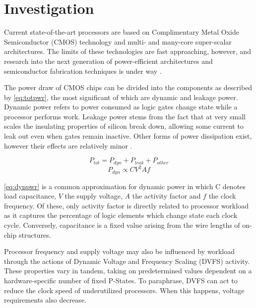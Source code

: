 \section{Investigation}
\label{sec:investigation}


Current state-of-the-art processors are based on Complimentary Metal Oxide Semiconductor (CMOS) technology and multi- and many-core super-scalar architectures. The limits of these technologies are fast  approaching, however, and research into the next generation of power-efficient architectures and semiconductor fabrication techniques is under way \cite{esmaeilzadeh:2011aa}.

The power draw of CMOS chips can be divided into the components as described by \autoref{eq:totpwr}, the most significant of which are dynamic and leakage power. Dynamic power refers to power consumed as logic gates change state while a processor performs work. Leakage power stems from the fact that at very small scales the insulating properties of silicon break down, allowing some current to leak out even when gates remain inactive. Other forms of power dissipation exist, however their effects are relatively minor \cite{kaxiras:2008aa}.


\begin{equation}
\label{eq:totpwr}
P_{tot} = P_{dyn} + P_{leak} + P_{other}
\end{equation}
\begin{equation} 
\label{eq:dynpwr}
P_{dyn} \propto CV^{2}Af
\end{equation}

\autoref{eq:dynpwr} is a common approximation for dynamic power in which C denotes load capacitance, $V$ the supply voltage, $A$ the activity factor and $f$ the clock frequency. Of these, only activity factor is directly related to processor workload as it captures the percentage of logic elements which change state each clock cycle. Conversely, capacitance is a fixed value arising from the wire lengths of on-chip structures.

Processor frequency and supply voltage may also be influenced by workload through the actions of Dynamic Voltage and Frequency Scaling (DVFS) activity. These properties vary in tandem, taking on predetermined values dependent on a hardware-specific number of fixed P-States. To paraphrase, DVFS can act to reduce the clock speed of underutilized processors. When this happens, voltage requirements also decrease.

